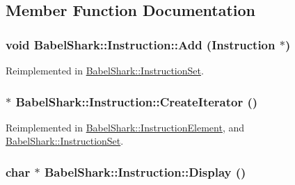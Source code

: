 \subsection{Member Function Documentation}
\hypertarget{class_babel_shark_1_1_instruction_9d74c7c3cb5e2d85e065b8633a3f395a}{
\subsubsection[{Add}]{\setlength{\rightskip}{0pt plus 5cm}void BabelShark::Instruction::Add ({\bf Instruction} $\ast$)}}
\label{class_babel_shark_1_1_instruction_9d74c7c3cb5e2d85e065b8633a3f395a}




Reimplemented in \hyperlink{class_babel_shark_1_1_instruction_set_0e95013b914e2f4bdda8b0f94ab87712}{BabelShark::InstructionSet}.\hypertarget{class_babel_shark_1_1_instruction_46ee71e94270716e917ad7293fee5aca}{
\subsubsection[{CreateIterator}]{ $\ast$ BabelShark::Instruction::CreateIterator ()}}
\label{class_babel_shark_1_1_instruction_46ee71e94270716e917ad7293fee5aca}




Reimplemented in \hyperlink{class_babel_shark_1_1_instruction_element_dfff8921ea8a00004193d2fec17e9a04}{BabelShark::InstructionElement}, and \hyperlink{class_babel_shark_1_1_instruction_set_0ab5a7495470214060e64f9f7bc2ac72}{BabelShark::InstructionSet}.\hypertarget{class_babel_shark_1_1_instruction_a1d1dd6ff30235fd6842fcf4204f7698}{
\subsubsection[{Display}]{\setlength{\rightskip}{0pt plus 5cm}char $\ast$ BabelShark::Instruction::Display ()}}
\label{class_babel_shark_1_1_instruction_a1d1dd6ff30235fd6842fcf4204f7698}




